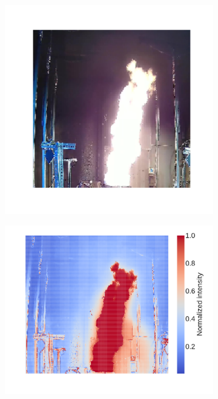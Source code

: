\documentclass{article}
\begin{document}
\begin{figure}[htbp]
  \centering
  \begin{subfigure}[t]{.35\textwidth}
      \centering
      \includegraphics[width=\textwidth,keepaspectratio]{figures/fire_image.pdf}
      \caption{}
      \label{fig:fire_image}
  \end{subfigure}
  \begin{subfigure}[t]{.4\textwidth}
      \centering
      \includegraphics[width=\textwidth ,keepaspectratio]{figures/brightness_heatmap.pdf}

\end{subfigure}
\end{figure}
\end{document}
